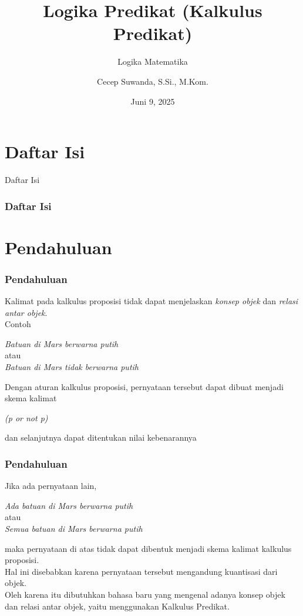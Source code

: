 \documentclass[handout]{beamer}
\subtitle[Logika Matematika]{Logika Matematika}
\title[Logika Predikat (Kalkulus Predikat)]{Logika Predikat (Kalkulus Predikat)}
\author{Cecep Suwanda, S.Si., M.Kom.}
\date{Juni 9, 2025}
\institute{Universitas Bale Bandung}
\theoremstyle{definition}
\theoremstyle{example}
\begin{document}
\maketitle


\section*{Daftar Isi}
\begin{frame}[shrink]{Daftar Isi}
\frametitle{Daftar Isi}
\tableofcontents
\end{frame}

\section{Pendahuluan}
\begin{frame}
\frametitle{Pendahuluan}

Kalimat pada kalkulus proposisi tidak dapat menjelaskan \textit{konsep objek} dan \textit{relasi antar objek}.\\
Contoh
\begin{center}
	\color{blue}
	\textit{Batuan di Mars berwarna putih}\\
atau\\
\textit{Batuan di Mars tidak berwarna putih}\\
\end{center}
Dengan aturan kalkulus proposisi, pernyataan tersebut dapat dibuat menjadi skema kalimat\\
\begin{center}
	\textit{(p or not p)}\\
\end{center}
dan selanjutnya dapat ditentukan nilai kebenarannya

\end{frame}

\begin{frame}
	\frametitle{Pendahuluan}	
	Jika ada pernyataan lain,\\
	\begin{center}
	\color{blue}	
		\textit{ Ada batuan di Mars berwarna putih}\\
	atau\\
	\textit{Semua batuan di Mars berwarna putih}\\
	\end{center}
	maka pernyataan di atas tidak dapat dibentuk menjadi skema kalimat kalkulus	proposisi.\\
	Hal ini disebabkan karena pernyataan tersebut mengandung {\color{blue} kuantisasi dari objek}.\\
	Oleh karena itu dibutuhkan bahasa baru yang mengenal adanya konsep objek dan relasi antar objek, yaitu menggunakan {\color{blue} Kalkulus Predikat}.	
\end{frame}
\end{document}
